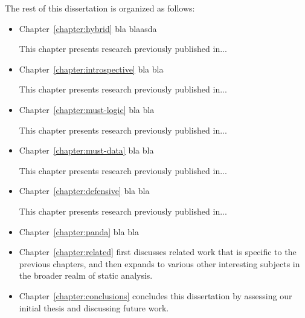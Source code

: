 The rest of this dissertation is organized as follows:
\begin{itemize}%
\item Chapter~\ref{chapter:hybrid} bla blaasda

    This chapter presents research previously published in...

\item Chapter~\ref{chapter:introspective} bla bla

    This chapter presents research previously published in...

\item Chapter~\ref{chapter:must-logic} bla bla

    This chapter presents research previously published in...

\item Chapter~\ref{chapter:must-data} bla bla

    This chapter presents research previously published in...

\item Chapter~\ref{chapter:defensive} bla bla

    This chapter presents research previously published in...
    
\item Chapter~\ref{chapter:panda} bla bla

\item Chapter~\ref{chapter:related} first discusses related work that
  is specific to the previous chapters, and then expands to various
  other interesting subjects in the broader realm of static analysis.

\item Chapter~\ref{chapter:conclusions} concludes this dissertation by assessing our initial thesis and discussing future work.
\end{itemize}